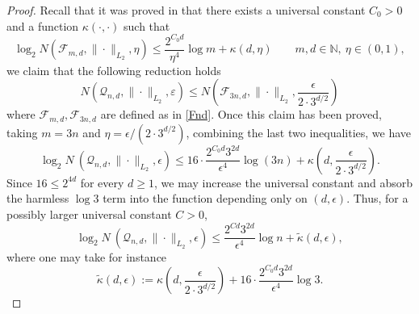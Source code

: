 \documentclass{amsbook}
\theoremstyle{definition}
\theoremstyle{remark}
\numberwithin{section}{chapter}
\numberwithin{equation}{chapter}
\newcommand{\1}{\mathbf{1}}
\begin{document}
\begin{proof}
Recall that it was proved in \cite[Theorem 9]{EIS2023} that
there exists a universal constant
	$C_0>0$ and a function $\kappa(\cdot,\cdot)$ such that
	\[
	\log_2 N(\mathcal F_{m,d},\|\cdot\|_{L_2},\eta)
	\le
	\frac{2^{C_0 d}}{\eta^4}\log m+\kappa(d,\eta)
	\qquad m,d\in\mathbb N,\ \eta\in(0,1),
	\]
we claim that the following reduction holds
	\[
	N \left(\mathcal Q_{n,d},\|\cdot\|_{L_2},\varepsilon\right)
	\le
	N \left(\mathcal F_{3n,d},\|\cdot\|_{L_2},\frac{\epsilon}{2\cdot 3^{d/2}}\right)
	\]
where $\mathcal F_{m,d},\mathcal F_{3n,d}$ are defined as in \eqref{Fnd}.
Once this claim has been proved, taking $m=3n$ and $\eta=\epsilon/(2\cdot 3^{d/2})$, combining  the last two inequalities, we have
	\[
	\log_2 N\ \left(\mathcal Q_{n,d},\|\cdot\|_{L_2},\epsilon\right)
	\le
	16\cdot \frac{2^{C_0 d}3^{2d}}{\epsilon^4}\log(3n)
	+
	\kappa \left(d,\frac{\epsilon}{2\cdot 3^{d/2}}\right).
	\]
	Since $16\le 2^{4d}$ for every $d\ge 1$, we may increase the universal constant and absorb
	the harmless $\log 3$ term into the function depending only on $(d,\epsilon)$. Thus,
	for a possibly larger universal constant $C>0$,
	\[
	\log_2 N\ \left(\mathcal Q_{n,d},\|\cdot\|_{L_2},\epsilon\right)
	\le
	\frac{2^{Cd}3^{2d}}{\epsilon^4}\log n+\widetilde{\kappa}(d,\epsilon),
	\]
	where one may take for instance
	\[
	\widetilde{\kappa}(d,\epsilon)
	:=
	\kappa\left(d,\frac{\epsilon}{2\cdot 3^{d/2}}\right)
	+
	16\cdot \frac{2^{C_0 d}3^{2d}}{\epsilon^4}\log 3.
	\]



\end{proof}
\end{document}
